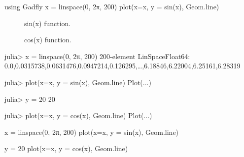 \begin{juliacode}
using Gadfly
x = linspace(0, 2π, 200)
plot(x=x, y = sin(x), Geom.line)
\end{juliacode}
\begin{figure}[ht]
\center
\resizebox{\linewidth}{!}{}
\caption{sin(x) function.}
\label{fig:sin_fun}
\end{figure}

\begin{figure}[htpb]
\center
\resizebox{\linewidth}{!}{}
\caption{cos(x) function.}
\end{figure}

\resizebox{\linewidth}{!}{}

\begin{juliaterm}
julia> x = linspace(0, 2π, 200)
200-element LinSpace{Float64}:
 0.0,0.0315738,0.0631476,0.0947214,0.126295,…,6.18846,6.22004,6.25161,6.28319

julia> plot(x=x, y = sin(x), Geom.line)
Plot(...)

\end{juliaterm}
\resizebox{\linewidth}{!}{}

\begin{juliaterm}
julia> y = 20
20

julia> plot(x=x, y = cos(x), Geom.line)
Plot(...)

\end{juliaterm}
\resizebox{\linewidth}{!}{}

\begin{juliacode}
x = linspace(0, 2π, 200)
plot(x=x, y = sin(x), Geom.line)
\end{juliacode}
\resizebox{15cm}{!}{}

\begin{juliacode}
y = 20
plot(x=x, y = cos(x), Geom.line)
\end{juliacode}
\resizebox{15cm}{!}{}
